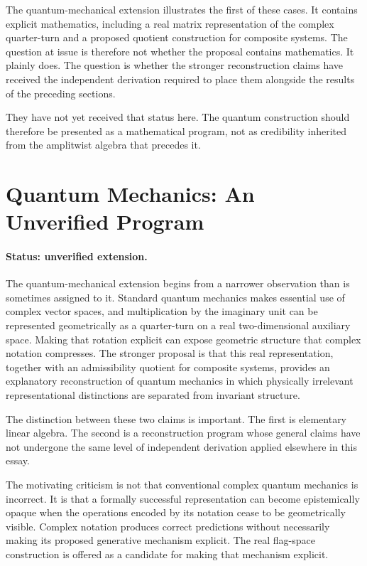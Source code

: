 \documentclass[11pt]{article}
\begin{document}
The quantum-mechanical extension illustrates the first of these cases. It contains explicit mathematics, including a real matrix representation of the complex quarter-turn and a proposed quotient construction for composite systems. The question at issue is therefore not whether the proposal contains mathematics. It plainly does. The question is whether the stronger reconstruction claims have received the independent derivation required to place them alongside the results of the preceding sections.

They have not yet received that status here. The quantum construction should therefore be presented as a mathematical program, not as credibility inherited from the amplitwist algebra that precedes it.

\section{Quantum Mechanics: An Unverified Program}

\paragraph{Status: unverified extension.}

The quantum-mechanical extension \citep{FlyxionRotation} begins from a narrower observation than is sometimes assigned to it. Standard quantum mechanics makes essential use of complex vector spaces, and multiplication by the imaginary unit can be represented geometrically as a quarter-turn on a real two-dimensional auxiliary space. Making that rotation explicit can expose geometric structure that complex notation compresses. The stronger proposal is that this real representation, together with an admissibility quotient for composite systems, provides an explanatory reconstruction of quantum mechanics in which physically irrelevant representational distinctions are separated from invariant structure.

The distinction between these two claims is important. The first is elementary linear algebra. The second is a reconstruction program whose general claims have not undergone the same level of independent derivation applied elsewhere in this essay.

The motivating criticism is not that conventional complex quantum mechanics is incorrect. It is that a formally successful representation can become epistemically opaque when the operations encoded by its notation cease to be geometrically visible. Complex notation produces correct predictions without necessarily making its proposed generative mechanism explicit. The real flag-space construction is offered as a candidate for making that mechanism explicit.
\end{document}
